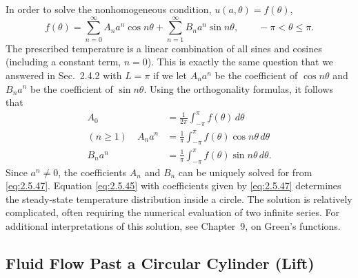 In order to solve the nonhomogeneous condition, $u(a,\theta) = f(\theta)$,
\begin{equation}
\label{eq:2.5.46}
f(\theta) = \sum_{n=0}^{\infty} A_n a^n \cos n\theta + \sum_{n=1}^{\infty} B_n a^n \sin n\theta, \qquad -\pi < \theta \le \pi.
\end{equation}
The prescribed temperature is a linear combination of all sines and cosines (including a constant term, $n = 0$). This is exactly the same question that we answered in Sec.~2.4.2 with $L = \pi$ if we let $A_n a^n$ be the coefficient of $\cos n\theta$ and $B_n a^n$ be the coefficient of $\sin n\theta$. Using the orthogonality formulas, it follows that
\begin{equation}
\label{eq:2.5.47}
\boxed{\begin{aligned}
A_0 &= \frac{1}{2\pi}\int_{-\pi}^{\pi} f(\theta)\,d\theta \\[6pt]
(n \ge 1) \quad A_n a^n &= \frac{1}{\pi}\int_{-\pi}^{\pi} f(\theta)\cos n\theta\,d\theta \\[6pt]
B_n a^n &= \frac{1}{\pi}\int_{-\pi}^{\pi} f(\theta)\sin n\theta\,d\theta.
\end{aligned}}
\end{equation}
Since $a^n \ne 0$, the coefficients $A_n$ and $B_n$ can be uniquely solved for from \eqref{eq:2.5.47}. Equation \eqref{eq:2.5.45} with coefficients given by \eqref{eq:2.5.47} determines the steady-state temperature distribution inside a circle. The solution is relatively complicated, often requiring the numerical evaluation of two infinite series. For additional interpretations of this solution, see Chapter~9, on Green's functions.

\subsection{Fluid Flow Past a Circular Cylinder (Lift)}
\label{sec:2.5.3}

